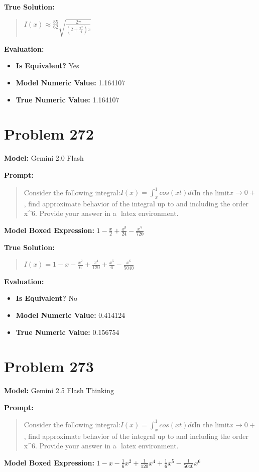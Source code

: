 \documentclass{article}
\begin{document}
{\textbf{True Solution:}
\begin{quote}
$I(x) \approx \frac{85}{62}\sqrt{\frac{2\pi}{(2+\frac{\pi^2}{4})x}}$
\end{quote}

\textbf{Evaluation:}
\begin{itemize}
\item \textbf{Is Equivalent?} Yes
\item \textbf{Model Numeric Value:} 1.164107
\item \textbf{True Numeric Value:} 1.164107
\end{itemize}
\vspace{1cm}
\section*{Problem 272}
\textbf{Model:} Gemini 2.0 Flash

\textbf{Prompt:}
\begin{quote}
Consider the following integral:$I(x)=\int_x^{1}cos(xt)dt$In the limit$x \to 0+$, find approximate behavior of the integral up to and including the order x^6. Provide your answer in a $\boxed{}$ latex environment.
\end{quote}
\textbf{Model Boxed Expression:} $1 - \frac{x}{2} + \frac{x^3}{24} - \frac{x^5}{720}$

\textbf{True Solution:}
\begin{quote}
$I(x) = 1 - x - \frac{x^2}{6} + \frac{x^4}{120} + \frac{x^5}{6} - \frac{x^6}{5040}$
\end{quote}

\textbf{Evaluation:}
\begin{itemize}
\item \textbf{Is Equivalent?} No
\item \textbf{Model Numeric Value:} 0.414124
\item \textbf{True Numeric Value:} 0.156754
\end{itemize}
\vspace{1cm}
\section*{Problem 273}
\textbf{Model:} Gemini 2.5 Flash Thinking

\textbf{Prompt:}
\begin{quote}
Consider the following integral:$I(x)=\int_x^{1}cos(xt)dt$In the limit$x \to 0+$, find approximate behavior of the integral up to and including the order x^6. Provide your answer in a $\boxed{}$ latex environment.
\end{quote}
\textbf{Model Boxed Expression:} $1 - x - \frac{1}{6}x^2 + \frac{1}{120}x^4 + \frac{1}{6}x^5 - \frac{1}{5040}x^6$

}
\end{document}
